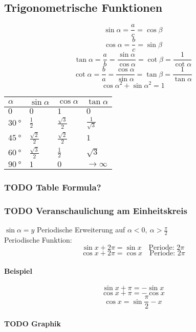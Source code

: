 \documentclass[a4paper]{scrartcl}
\begin{document}
\subsection{Trigonometrische Funktionen}
\label{sec-5-7}
\[\sin{\alpha} = \frac{a}{c} = \cos{\beta}\]
\[\cos{\alpha} = \frac{b}{c} = \sin{\beta}\]
\[\tan{\alpha} = \frac{a}{b}=\frac{\sin{\alpha}}{\cos{\alpha}} = \cot{\beta} = \frac{1}{\cot{\alpha}}\]
\[\cot{\alpha} = \frac{b}{a}=\frac{\cos{\alpha}}{\sin{\alpha}} = \tan{\beta} = \frac{1}{\tan{\alpha}}\]
\[\cos{\alpha}^2 + \sin{\alpha}^2 = 1\]

\begin{center}
\begin{tabular}{llll}
$\alpha$ & $\sin{\alpha}$ & $\cos{\alpha}$ & $\tan{\alpha}$\\
\hline
$0$ & $0$ & $1$ & $0$\\
$\SI{30}{\degree}$ & $\frac{1}{2}$ & $\frac{\sqrt{3}}{2}$ & $\frac{1}{\sqrt{3}}$\\
$\SI{45}{\degree}$ & $\frac{\sqrt{2}}{2}$ & $\frac{\sqrt{2}}{2}$ & $1$\\
$\SI{60}{\degree}$ & $\frac{\sqrt{3}}{2}$ & $\frac{1}{2}$ & $\sqrt{3}$\\
$\SI{90}{\degree}$ & $1$ & $0$ & $\to\infty$\\
\end{tabular}
\end{center}
\subsubsection{{\bfseries\sffamily TODO} Table Formula?}
\label{sec-5-7-1}
\subsubsection{{\bfseries\sffamily TODO} Veranschaulichung am Einheitskreis}
\label{sec-5-7-2}
$\sin{\alpha} = y$
Periodische Erweiterung auf $\alpha < 0,~\alpha>\frac{\pi}{2}$ \\
        Periodische Funktion: \[\sin{x + 2\pi} = \sin{x}\quad\text{Periode: }2\pi\]
\[\cos{x + 2\pi} = \cos{x}\quad\text{Periode: }2\pi\]
\paragraph{Beispiel}
\label{sec-5-7-2-1}
\[\sin{x + \pi} = -\sin{x}\]
\[\cos{x + \pi} = -\cos{x}\]
\[\cos{x} = \sin{\frac{\pi}{2}-x}\]
\paragraph{{\bfseries\sffamily TODO} Graphik}
\label{sec-5-7-2-2}
\end{document}
